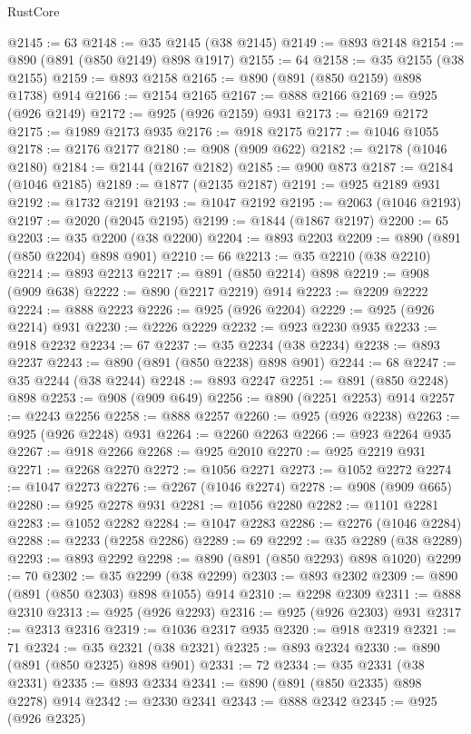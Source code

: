 \begin{lexlean}{RustCore}
\begin{coremodule}
@2145 := 63
@2148 := @35 @2145 (@38 @2145)
@2149 := @893 @2148
@2154 := @890 (@891 (@850 @2149) @898 @1917)
@2155 := 64
@2158 := @35 @2155 (@38 @2155)
@2159 := @893 @2158
@2165 := @890 (@891 (@850 @2159) @898 @1738) @914
@2166 := @2154 @2165
@2167 := @888 @2166
@2169 := @925 (@926 @2149)
@2172 := @925 (@926 @2159) @931
@2173 := @2169 @2172
@2175 := @1989 @2173 @935
@2176 := @918 @2175
@2177 := @1046 @1055
@2178 := @2176 @2177
@2180 := @908 (@909 @622)
@2182 := @2178 (@1046 @2180)
@2184 := @2144 (@2167 @2182)
@2185 := @900 @873
@2187 := @2184 (@1046 @2185)
@2189 := @1877 (@2135 @2187)
@2191 := @925 @2189 @931
@2192 := @1732 @2191
@2193 := @1047 @2192
@2195 := @2063 (@1046 @2193)
@2197 := @2020 (@2045 @2195)
@2199 := @1844 (@1867 @2197)
@2200 := 65
@2203 := @35 @2200 (@38 @2200)
@2204 := @893 @2203
@2209 := @890 (@891 (@850 @2204) @898 @901)
@2210 := 66
@2213 := @35 @2210 (@38 @2210)
@2214 := @893 @2213
@2217 := @891 (@850 @2214) @898
@2219 := @908 (@909 @638)
@2222 := @890 (@2217 @2219) @914
@2223 := @2209 @2222
@2224 := @888 @2223
@2226 := @925 (@926 @2204)
@2229 := @925 (@926 @2214) @931
@2230 := @2226 @2229
@2232 := @923 @2230 @935
@2233 := @918 @2232
@2234 := 67
@2237 := @35 @2234 (@38 @2234)
@2238 := @893 @2237
@2243 := @890 (@891 (@850 @2238) @898 @901)
@2244 := 68
@2247 := @35 @2244 (@38 @2244)
@2248 := @893 @2247
@2251 := @891 (@850 @2248) @898
@2253 := @908 (@909 @649)
@2256 := @890 (@2251 @2253) @914
@2257 := @2243 @2256
@2258 := @888 @2257
@2260 := @925 (@926 @2238)
@2263 := @925 (@926 @2248) @931
@2264 := @2260 @2263
@2266 := @923 @2264 @935
@2267 := @918 @2266
@2268 := @925 @2010
@2270 := @925 @2219 @931
@2271 := @2268 @2270
@2272 := @1056 @2271
@2273 := @1052 @2272
@2274 := @1047 @2273
@2276 := @2267 (@1046 @2274)
@2278 := @908 (@909 @665)
@2280 := @925 @2278 @931
@2281 := @1056 @2280
@2282 := @1101 @2281
@2283 := @1052 @2282
@2284 := @1047 @2283
@2286 := @2276 (@1046 @2284)
@2288 := @2233 (@2258 @2286)
@2289 := 69
@2292 := @35 @2289 (@38 @2289)
@2293 := @893 @2292
@2298 := @890 (@891 (@850 @2293) @898 @1020)
@2299 := 70
@2302 := @35 @2299 (@38 @2299)
@2303 := @893 @2302
@2309 := @890 (@891 (@850 @2303) @898 @1055) @914
@2310 := @2298 @2309
@2311 := @888 @2310
@2313 := @925 (@926 @2293)
@2316 := @925 (@926 @2303) @931
@2317 := @2313 @2316
@2319 := @1036 @2317 @935
@2320 := @918 @2319
@2321 := 71
@2324 := @35 @2321 (@38 @2321)
@2325 := @893 @2324
@2330 := @890 (@891 (@850 @2325) @898 @901)
@2331 := 72
@2334 := @35 @2331 (@38 @2331)
@2335 := @893 @2334
@2341 := @890 (@891 (@850 @2335) @898 @2278) @914
@2342 := @2330 @2341
@2343 := @888 @2342
@2345 := @925 (@926 @2325)

\end{coremodule}
\end{lexlean}

